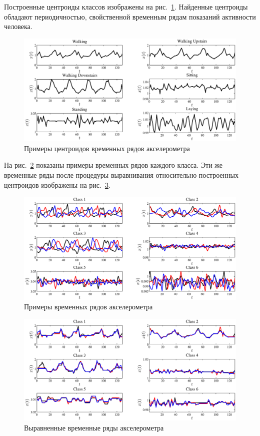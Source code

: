 	Построенные центроиды классов изображены на рис.~\ref{centroids_real}.
	Найденные центроиды обладают периодичностью, свойственной временным рядам показаний активности человека.
	\begin{figure}[ht]
		\centering
		\includegraphics[width=1\linewidth]{figs/ch4/centroids_200_2}
		\caption{Примеры центроидов временных рядов акселерометра}
		\label{centroids_real}
	\end{figure}
	На рис.~\ref{raw_ts} показаны примеры временных рядов каждого класса. Эти же временные ряды после процедуры выравнивания относительно построенных центроидов изображены на рис.~\ref{aligned_ts}.
	\begin{figure}[!ht]
		\centering
		\includegraphics[width=1\linewidth]{figs/ch4/raw_ts}
		\caption{Примеры временных рядов акселерометра}
		\label{raw_ts}
	\end{figure}
	\begin{figure}[!ht]
		\centering
		\includegraphics[width=1\linewidth]{figs/ch4/aligned_ts}
		\caption{Выравненные временные ряды акселерометра}
		\label{aligned_ts}
	\end{figure}
	

